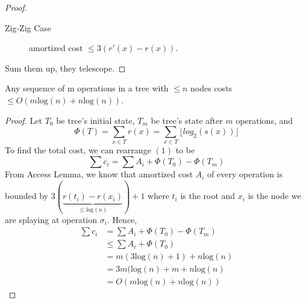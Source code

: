 \documentclass[12pt]{article}
\begin{document}
\begin{proof}
\begin{description}
\begin{minipage}[t]{\linewidth}
{              }
            \end{minipage}
        \item[Zig-Zig Case] 
            \begin{minipage}[t]{\linewidth}
              amortized cost $\leq 3(r'(x) - r(x))$. \\
              \raggedright
            \end{minipage}
    \end{description}
    Sum them up, they telescope.
\end{proof}

\begin{theorem} Any sequence of m operations in a tree with $\leq n$ nodes costs $\leq
    O(m\text{log}(n)+n\text{log}(n))$.
\end{theorem}
\begin{proof}
    Let $T_0$ be tree's initial state, $T_m$ be tree's state after $m$ operations, and $$\Phi(T) =
    \sum_{x \in T} r(x) = \sum_{x \in T} \lfloor log_2(s(x)) \rfloor$$
    To find the total cost, we can rearrange $(1)$ to be $$\sum c_i = \sum A_i + \Phi(T_0) - \Phi(T_m)$$
    From Access Lemma, we know that amortized cost $A_i$ of every operation is bounded by
    $3(\underbrace{r(t_i)-r(x_i)}_{\leq \text{log}(n)})+1$ where $t_i$ is the root and $x_i$ is the node we are
    splaying at operation $\sigma_i$.
    Hence, 
    \begin{align*}
        \sum c_i &= \sum A_i + \Phi(T_0) - \Phi(T_m)\\
                 &\leq \sum A_i + \Phi(T_0) \\
                 &= m(3\text{log}(n)+1) + n\text{log}(n)\\
                 &= 3m(\text{log}(n) + m + n\text{log}(n)\\
                 &= O(m\text{log}(n)+n\text{log}(n))
    \end{align*}
\end{proof}
\end{document}
